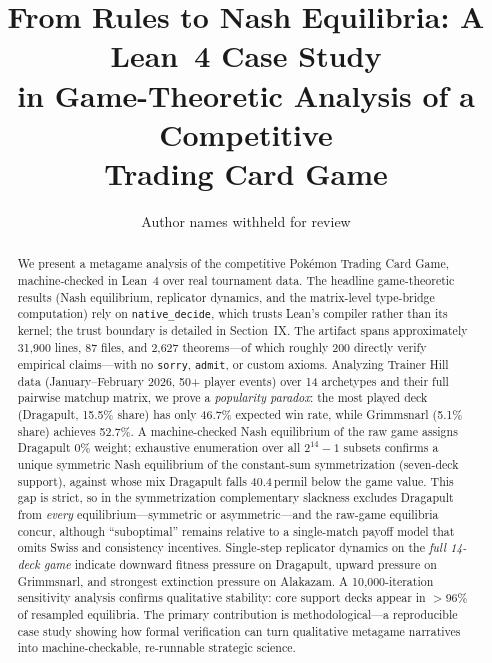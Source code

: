 \documentclass[journal]{IEEEtran}
\newif\ifhighlightchanges
\newcommand{\revised}[1]{\ifhighlightchanges\textcolor{blue!70!black}{#1}\else#1\fi}
\begin{document}
\title{From Rules to Nash Equilibria: A Lean~4 Case Study\\in Game-Theoretic Analysis of a Competitive\\Trading Card Game}

\author{Author names withheld for review}

\maketitle

\begin{abstract}
We present a metagame analysis of the competitive Pok\'emon Trading Card Game, machine-checked in Lean~4 over real tournament data.
The headline game-theoretic results (Nash equilibrium, replicator dynamics, and the matrix-level type-bridge computation) rely on \texttt{native\_decide}, which trusts Lean's compiler rather than its kernel; the trust boundary is detailed in Section~IX.
The artifact spans approximately 31{,}900 lines, 87 files, and 2{,}627 theorems---of which roughly 200 directly verify empirical claims---with no \texttt{sorry}, \texttt{admit}, or custom axioms.
Analyzing Trainer Hill data (January--February 2026, 50+ player events) over 14 archetypes and their full pairwise matchup matrix, we prove a \emph{popularity paradox}: the most played deck (Dragapult, 15.5\% share) has only 46.7\% expected win rate, while Grimmsnarl (5.1\% share) achieves 52.7\%.
A machine-checked Nash equilibrium of the raw game assigns Dragapult 0\% weight; exhaustive enumeration over all $2^{14}-1$ subsets confirms a unique symmetric Nash equilibrium of the constant-sum symmetrization (seven-deck support), against whose mix Dragapult falls \revised{40.4\,permil} below the game value.
\revised{This gap is strict, so in the symmetrization complementary slackness excludes Dragapult from \emph{every} equilibrium---symmetric or asymmetric---and the raw-game equilibria concur, although ``suboptimal'' remains relative to a single-match payoff model that omits Swiss and consistency incentives.}
Single-step replicator dynamics on the \emph{full 14-deck game} indicate downward fitness pressure on Dragapult, upward pressure on Grimmsnarl, and strongest extinction pressure on Alakazam.
A 10{,}000-iteration sensitivity analysis confirms qualitative stability: core support decks appear in $>$96\% of resampled equilibria.
\revised{The primary contribution is methodological---a reproducible case study} showing how formal verification \revised{can turn} qualitative metagame narratives into machine-checkable, \revised{re-runnable} strategic science.
\end{abstract}
\end{document}
